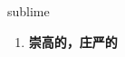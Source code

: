 
\begin{frame}
{\huge sublime}
\begin{center}
\begin{enumerate}\Large
  \item \textbf{崇高的，庄严的}
\end{enumerate}
\end{center}
\end{frame}
